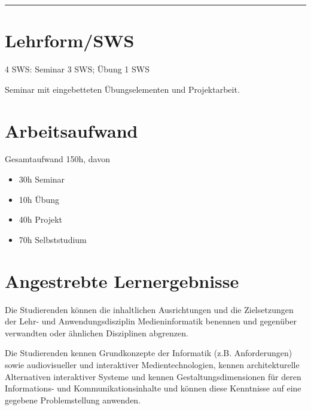 \begin{center}\rule{0.5\linewidth}{0.5pt}\end{center}

\hypertarget{lehrformswspathlabel....srcmodulbeschreibungen-bachelor-bpo5ba_medienprojekt}{%
\section*{Lehrform/SWS\label{../../src/modulbeschreibungen-bachelor-bpo5/BA_Medienprojekt}}\label{lehrformswspathlabel....srcmodulbeschreibungen-bachelor-bpo5ba_medienprojekt}}

4 SWS: Seminar 3 SWS; Übung 1 SWS

Seminar mit eingebetteten Übungselementen und Projektarbeit.

\hypertarget{arbeitsaufwandpathlabel....srcmodulbeschreibungen-bachelor-bpo5ba_medienprojekt}{%
\section*{Arbeitsaufwand\label{../../src/modulbeschreibungen-bachelor-bpo5/BA_Medienprojekt}}\label{arbeitsaufwandpathlabel....srcmodulbeschreibungen-bachelor-bpo5ba_medienprojekt}}

Gesamtaufwand 150h, davon

\begin{itemize}
\tightlist
\item
  30h Seminar
\item
  10h Übung
\item
  40h Projekt
\item
  70h Selbststudium
\end{itemize}

\hypertarget{angestrebte-lernergebnissepathlabel....srcmodulbeschreibungen-bachelor-bpo5ba_medienprojekt}{%
\section*{Angestrebte
Lernergebnisse\label{../../src/modulbeschreibungen-bachelor-bpo5/BA_Medienprojekt}}\label{angestrebte-lernergebnissepathlabel....srcmodulbeschreibungen-bachelor-bpo5ba_medienprojekt}}

Die Studierenden können die inhaltlichen Ausrichtungen und die
Zielsetzungen der Lehr- und Anwendungsdisziplin Medieninformatik
benennen und gegenüber verwandten oder ähnlichen Disziplinen abgrenzen.

Die Studierenden kennen Grundkonzepte der Informatik (z.B.
Anforderungen) sowie audiovisueller und interaktiver Medientechnologien,
kennen architekturelle Alternativen interaktiver Systeme und kennen
Gestaltungsdimensionen für deren Informations- und Kommunikationsinhalte
und können diese Kenntnisse auf eine gegebene Problemstellung anwenden.

